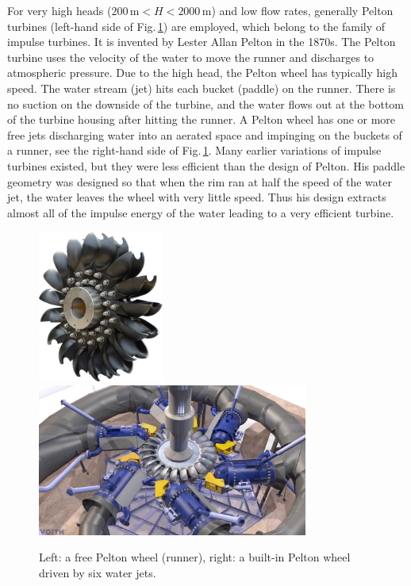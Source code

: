 For very high heads ($200\,\mathrm{m}<H<2000\,\mathrm{m}$) and low flow rates, generally Pelton turbines (left-hand side of Fig.\,\ref{Fig:pelton_turbine}) are employed, which belong to the family of impulse turbines. It is invented by Lester Allan Pelton in the 1870s. The Pelton turbine uses the velocity of the water to move the runner and discharges to atmospheric pressure. Due to the high head, the Pelton wheel has typically high speed. The water stream (jet) hits each bucket (paddle) on the runner. There is no suction on the downside of the turbine, and the water flows out at the bottom of the turbine housing after hitting the runner. A Pelton wheel has one or more free jets discharging water into an aerated space and impinging on the buckets of a runner, see the right-hand side of Fig.\,\ref{Fig:pelton_turbine}. Many earlier variations of impulse turbines existed, but they were less efficient than the design of Pelton. His paddle geometry was designed so that when the rim ran at half the speed of the water jet, the water leaves the wheel with very little speed. Thus his design extracts almost all of the impulse energy of the water leading to a very efficient turbine.

\begin{figure}[ht!]
	\centering
		\includegraphics[height=5cm]{HydroAndWindPower/Figures/Pelton_Turbine_1.jpg}
		\includegraphics[height=5cm]{HydroAndWindPower/Figures/Pelton_Turbine_2.jpg}
	\caption{Left: a free Pelton wheel (runner), right: a built-in Pelton wheel driven by six water jets.}
	\label{Fig:pelton_turbine}
\end{figure}

